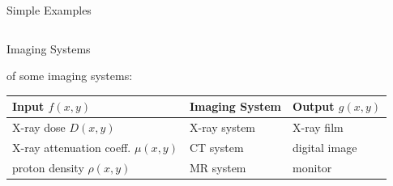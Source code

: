 \begin{frame}[c]{Simple Examples}
\begin{columns}[c, onlytextwidth]
\begin{column}{0.5\textwidth}
{\begin{center}
                \end{center}
            }
        \end{column}
    \end{columns}

\end{frame}

\begin{frame}[c]{Imaging Systems}

    \myExample{} of some imaging systems:\newline{}

    \begin{table}
        \def\arraystretch{1.7}
        \begin{tabular}{lll}
            \toprule
            Input $f(x,y)$                      & Imaging System & Output $g(x,y)$ \\
            \midrule
            X-ray dose $D(x,y)$                 & X-ray system   & X-ray film      \\
            X-ray attenuation coeff. $\mu(x,y)$ & CT system      & digital image   \\
            proton density $\rho(x,y)$          & MR system      & monitor         \\
            \bottomrule
        \end{tabular}
    \end{table}
\end{frame}






